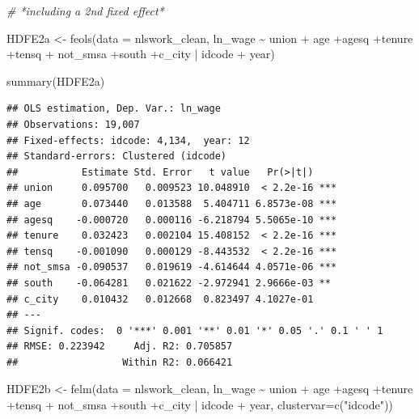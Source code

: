 \documentclass[
]{article}
\newenvironment{Shaded}{\begin{snugshade}}{\end{snugshade}}
\newcommand{\AttributeTok}[1]{\textcolor[rgb]{0.77,0.63,0.00}{#1}}
\newcommand{\CommentTok}[1]{\textcolor[rgb]{0.56,0.35,0.01}{\textit{#1}}}
\newcommand{\FunctionTok}[1]{\textcolor[rgb]{0.00,0.00,0.00}{#1}}
\newcommand{\NormalTok}[1]{#1}
\newcommand{\OtherTok}[1]{\textcolor[rgb]{0.56,0.35,0.01}{#1}}
\newcommand{\SpecialCharTok}[1]{\textcolor[rgb]{0.00,0.00,0.00}{#1}}
\newcommand{\StringTok}[1]{\textcolor[rgb]{0.31,0.60,0.02}{#1}}
\begin{document}
\begin{Shaded}
\begin{Highlighting}[]
\CommentTok{\# *including a 2nd fixed effect*}

\NormalTok{  HDFE2a }\OtherTok{\textless{}{-}} \FunctionTok{feols}\NormalTok{(}\AttributeTok{data =}\NormalTok{ nlswork\_clean, ln\_wage }\SpecialCharTok{\textasciitilde{}}\NormalTok{ union }\SpecialCharTok{+}
\NormalTok{                    age }\SpecialCharTok{+}\NormalTok{agesq }\SpecialCharTok{+}\NormalTok{tenure }\SpecialCharTok{+}\NormalTok{tensq }\SpecialCharTok{+}
\NormalTok{                    not\_smsa }\SpecialCharTok{+}\NormalTok{south }\SpecialCharTok{+}\NormalTok{c\_city }\SpecialCharTok{|}\NormalTok{ idcode }\SpecialCharTok{+}\NormalTok{ year)}
  
      \FunctionTok{summary}\NormalTok{(HDFE2a)}
\end{Highlighting}
\end{Shaded}

\begin{verbatim}
## OLS estimation, Dep. Var.: ln_wage
## Observations: 19,007 
## Fixed-effects: idcode: 4,134,  year: 12
## Standard-errors: Clustered (idcode) 
##           Estimate Std. Error   t value   Pr(>|t|)    
## union     0.095700   0.009523 10.048910  < 2.2e-16 ***
## age       0.073440   0.013588  5.404711 6.8573e-08 ***
## agesq    -0.000720   0.000116 -6.218794 5.5065e-10 ***
## tenure    0.032423   0.002104 15.408152  < 2.2e-16 ***
## tensq    -0.001090   0.000129 -8.443532  < 2.2e-16 ***
## not_smsa -0.090537   0.019619 -4.614644 4.0571e-06 ***
## south    -0.064281   0.021622 -2.972941 2.9666e-03 ** 
## c_city    0.010432   0.012668  0.823497 4.1027e-01    
## ---
## Signif. codes:  0 '***' 0.001 '**' 0.01 '*' 0.05 '.' 0.1 ' ' 1
## RMSE: 0.223942     Adj. R2: 0.705857
##                  Within R2: 0.066421
\end{verbatim}

\begin{Shaded}
\begin{Highlighting}[]
\NormalTok{  HDFE2b }\OtherTok{\textless{}{-}} \FunctionTok{felm}\NormalTok{(}\AttributeTok{data =}\NormalTok{ nlswork\_clean, ln\_wage }\SpecialCharTok{\textasciitilde{}}\NormalTok{ union }\SpecialCharTok{+}
\NormalTok{                   age }\SpecialCharTok{+}\NormalTok{agesq }\SpecialCharTok{+}\NormalTok{tenure }\SpecialCharTok{+}\NormalTok{tensq }\SpecialCharTok{+}
\NormalTok{                   not\_smsa }\SpecialCharTok{+}\NormalTok{south }\SpecialCharTok{+}\NormalTok{c\_city  }\SpecialCharTok{|}\NormalTok{ idcode }\SpecialCharTok{+}\NormalTok{ year, }\AttributeTok{clustervar=}\FunctionTok{c}\NormalTok{(}\StringTok{"idcode"}\NormalTok{))}
\end{Highlighting}
\end{Shaded}
\end{document}
